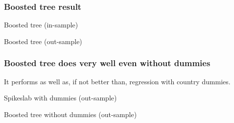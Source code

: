 \documentclass{beamer}
\begin{document}
\begin{frame}
\frametitle{Boosted tree result}
\begin{table}
	
	\caption{Boosted tree (in-sample)}
\end{table}
\begin{table}
	
	\caption{Boosted tree (out-sample)}
\end{table}
\end{frame}

\begin{frame}
\frametitle{Boosted tree does very well even without dummies}
It performs as well as, if not better than, regression with country dummies.
\begin{table}
	
	\caption{Spikeslab with dummies (out-sample)}
\end{table}
\begin{table}
	
	\caption{Boosted tree without dummies (out-sample)}
\end{table}
\end{frame}
\end{document}
